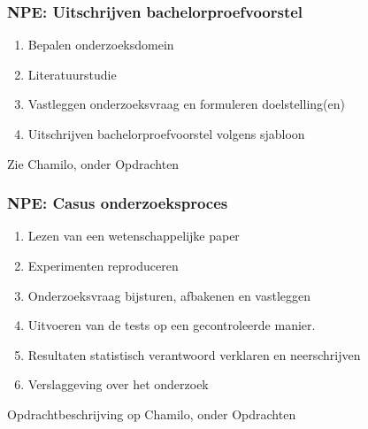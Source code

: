 \documentclass{beamer}
\begin{document}
\begin{frame}
  \frametitle{NPE: Uitschrijven bachelorproefvoorstel}

  \begin{enumerate}
    \item Bepalen onderzoeksdomein
    \item Literatuurstudie
    \item Vastleggen onderzoeksvraag en formuleren doelstelling(en)
    \item Uitschrijven bachelorproefvoorstel volgens sjabloon
  \end{enumerate}

  Zie Chamilo, onder Opdrachten
\end{frame}

\begin{frame}
  \frametitle{NPE: Casus onderzoeksproces}


  \begin{enumerate}
    \item Lezen van een wetenschappelijke paper
    \item Experimenten reproduceren
    \item Onderzoeksvraag bijsturen, afbakenen en vastleggen
    \item Uitvoeren van de tests op een gecontroleerde manier.
    \item Resultaten statistisch verantwoord verklaren en neerschrijven
    \item Verslaggeving over het onderzoek
  \end{enumerate}

  Opdrachtbeschrijving op Chamilo, onder Opdrachten
\end{frame}


\end{document}
